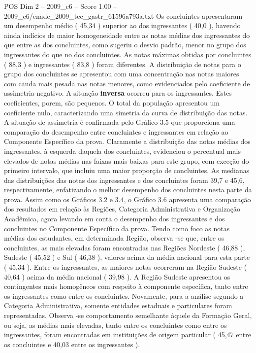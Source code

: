 \begin{textsample}{POS Dim 2 – 2009\_c6 – Score 1.00 – 2009\_c6/enade\_2009\_tec\_gastr\_61596a793a.txt}
Os concluintes apresentaram um desempenho médio ( 45,34 ) superior ao dos ingressantes ( 40,0 ), havendo ainda indícios de maior homogeneidade entre as notas médias dos ingressantes do que entre as dos concluintes, como sugeriu o desvio padrão, menor no grupo dos ingressantes do que no dos concluintes.
As notas máximas obtidas por concluintes ( 88,3 ) e ingressantes ( 83,8 ) foram diferentes.
A distribuição de notas para o grupo dos concluintes se apresentou com uma concentração nas notas maiores com cauda mais pesada nas notas menores, como evidenciados pelo coeficiente de assimetria negativo.
A situação \textbf{inversa} ocorreu para os ingressantes.
Estes coeficientes, porem, são pequenos.
O total da população apresentou um coeficiente nulo, caracterizando uma simetria da curva de distribuição das notas.
A situação de assimetria é confirmada pelo Gráfico 3.5 que proporciona uma comparação do desempenho entre concluintes e ingressantes em relação ao Componente Específico da prova.
Claramente a distribuição das notas médias dos ingressantes, à esquerda daquela dos concluintes, evidenciou o percentual mais elevados de notas médias nas faixas mais baixas para este grupo, com exceção do primeiro intervalo, que incluiu uma maior proporção de concluintes.
As medianas das distribuições das notas dos ingressantes e dos concluintes foram 39,7 e 45,6, respectivamente, enfatizando o melhor desempenho dos concluintes nesta parte da prova.
Assim como os Gráficos 3.2 e 3.4, o Gráfico 3.6 apresenta uma comparação dos resultados em relação às Regiões, Categoria Administrativa e Organização Acadêmica, agora levando em conta o desempenho dos ingressantes e dos concluintes no Componente Específico da prova.
Tendo como foco as notas médias dos estudantes, em determinada Região, observa -se que, entre os concluintes, as mais elevadas foram encontradas nas Regiões Nordeste ( 46,88 ), Sudeste ( 45,52 ) e Sul ( 46,38 ), valores acima da média nacional para esta parte ( 45,34 ).
Entre os ingressantes, as maiores notas ocorreram na Região Sudeste ( 40,64 ) acima da média nacional ( 39,98 ).
A Região Sudeste apresentou os contingentes mais homogêneos com respeito à componente específica, tanto entre os ingressantes como entre os concluintes.
Novamente, para a análise segundo a Categoria Administrativa, somente entidades estaduais e particulares foram representadas.
Observa -se comportamento semelhante àquele da Formação Geral, ou seja, as médias mais elevadas, tanto entre os concluintes como entre os ingressantes, foram encontradas em instituições de origem particular ( 45,47 entre os concluintes e 40,03 entre os ingressantes ).

\end{textsample}

